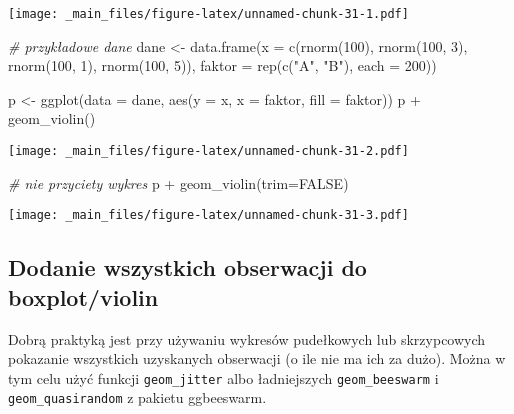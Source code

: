 \documentclass[
]{book}
\newenvironment{Shaded}{\begin{snugshade}}{\end{snugshade}}
\newcommand{\AttributeTok}[1]{\textcolor[rgb]{0.77,0.63,0.00}{#1}}
\newcommand{\CommentTok}[1]{\textcolor[rgb]{0.56,0.35,0.01}{\textit{#1}}}
\newcommand{\ConstantTok}[1]{\textcolor[rgb]{0.00,0.00,0.00}{#1}}
\newcommand{\DecValTok}[1]{\textcolor[rgb]{0.00,0.00,0.81}{#1}}
\newcommand{\FunctionTok}[1]{\textcolor[rgb]{0.00,0.00,0.00}{#1}}
\newcommand{\NormalTok}[1]{#1}
\newcommand{\OtherTok}[1]{\textcolor[rgb]{0.56,0.35,0.01}{#1}}
\newcommand{\SpecialCharTok}[1]{\textcolor[rgb]{0.00,0.00,0.00}{#1}}
\newcommand{\StringTok}[1]{\textcolor[rgb]{0.31,0.60,0.02}{#1}}
\begin{document}
\texttt{[image: \_main\_files/figure-latex/unnamed-chunk-31-1.pdf]}

\begin{Shaded}
\begin{Highlighting}[]
\CommentTok{\# przykładowe dane}
\NormalTok{dane }\OtherTok{\textless{}{-}} \FunctionTok{data.frame}\NormalTok{(}\AttributeTok{x =} \FunctionTok{c}\NormalTok{(}\FunctionTok{rnorm}\NormalTok{(}\DecValTok{100}\NormalTok{), }\FunctionTok{rnorm}\NormalTok{(}\DecValTok{100}\NormalTok{, }\DecValTok{3}\NormalTok{), }\FunctionTok{rnorm}\NormalTok{(}\DecValTok{100}\NormalTok{, }\DecValTok{1}\NormalTok{), }\FunctionTok{rnorm}\NormalTok{(}\DecValTok{100}\NormalTok{, }\DecValTok{5}\NormalTok{)), }
                   \AttributeTok{faktor =} \FunctionTok{rep}\NormalTok{(}\FunctionTok{c}\NormalTok{(}\StringTok{"A"}\NormalTok{, }\StringTok{"B"}\NormalTok{), }\AttributeTok{each =} \DecValTok{200}\NormalTok{))}

\NormalTok{p }\OtherTok{\textless{}{-}} \FunctionTok{ggplot}\NormalTok{(}\AttributeTok{data =}\NormalTok{ dane, }\FunctionTok{aes}\NormalTok{(}\AttributeTok{y =}\NormalTok{ x, }\AttributeTok{x =}\NormalTok{ faktor, }\AttributeTok{fill =}\NormalTok{ faktor))}
\NormalTok{p }\SpecialCharTok{+} \FunctionTok{geom\_violin}\NormalTok{()}
\end{Highlighting}
\end{Shaded}

\texttt{[image: \_main\_files/figure-latex/unnamed-chunk-31-2.pdf]}

\begin{Shaded}
\begin{Highlighting}[]
\CommentTok{\# nie przyciety wykres}
\NormalTok{p }\SpecialCharTok{+} \FunctionTok{geom\_violin}\NormalTok{(}\AttributeTok{trim=}\ConstantTok{FALSE}\NormalTok{)}
\end{Highlighting}
\end{Shaded}

\texttt{[image: \_main\_files/figure-latex/unnamed-chunk-31-3.pdf]}

\hypertarget{dodanie-wszystkich-obserwacji-do-boxplotviolin}{%
\subsection{Dodanie wszystkich obserwacji do boxplot/violin}\label{dodanie-wszystkich-obserwacji-do-boxplotviolin}}

Dobrą praktyką jest przy używaniu wykresów pudełkowych lub skrzypcowych pokazanie wszystkich uzyskanych obserwacji (o ile nie ma ich za dużo). Można w tym celu użyć funkcji \texttt{geom\_jitter} albo ładniejszych \texttt{geom\_beeswarm} i \texttt{geom\_quasirandom} z pakietu ggbeeswarm.
\end{document}
